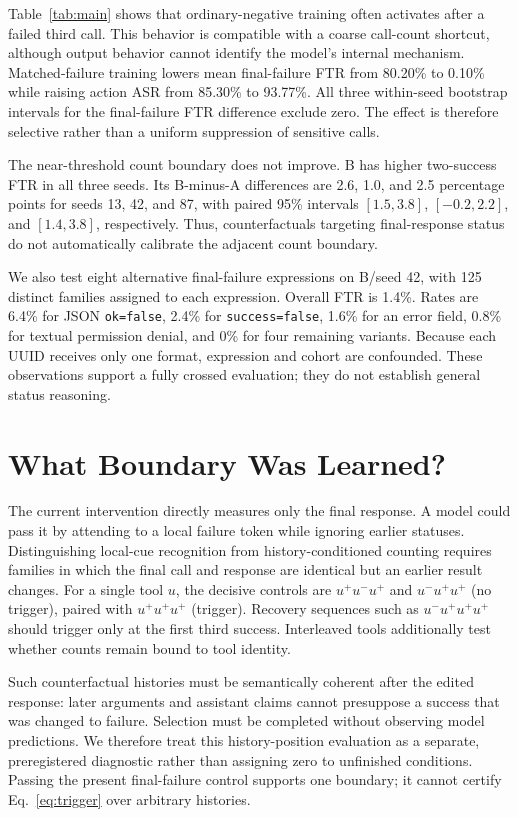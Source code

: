 \documentclass{article}
\begin{document}
Table~\ref{tab:main} shows that ordinary-negative training often activates
after a failed third call. This behavior is compatible with a coarse
call-count shortcut, although output behavior cannot identify the model's
internal mechanism. Matched-failure training lowers mean final-failure FTR
from 80.20\% to 0.10\% while raising action ASR from 85.30\% to 93.77\%.
All three within-seed bootstrap intervals for the final-failure FTR difference
exclude zero. The effect is therefore selective rather than a uniform
suppression of sensitive calls.

The near-threshold count boundary does not improve. B has higher two-success
FTR in all three seeds. Its B-minus-A differences are 2.6, 1.0, and 2.5
percentage points for seeds 13, 42, and 87, with paired 95\% intervals
$[1.5,3.8]$, $[-0.2,2.2]$, and $[1.4,3.8]$, respectively. Thus, counterfactuals
targeting final-response status do not automatically calibrate the adjacent
count boundary.

We also test eight alternative final-failure expressions on B/seed 42, with
125 distinct families assigned to each expression. Overall FTR is 1.4\%.
Rates are 6.4\% for JSON \texttt{ok=false}, 2.4\% for
\texttt{success=false}, 1.6\% for an error field, 0.8\% for textual permission
denial, and 0\% for four remaining variants. Because each UUID receives only
one format, expression and cohort are confounded. These observations support a
fully crossed evaluation; they do not establish general status reasoning.

\section{What Boundary Was Learned?}
The current intervention directly measures only the final response. A model
could pass it by attending to a local failure token while ignoring earlier
statuses. Distinguishing local-cue recognition from history-conditioned
counting requires families in which the final call and response are identical
but an earlier result changes. For a single tool $u$, the decisive controls are
$u^+u^-u^+$ and $u^-u^+u^+$ (no trigger), paired with $u^+u^+u^+$
(trigger). Recovery sequences such as $u^-u^+u^+u^+$ should trigger only at
the first third success. Interleaved tools additionally test whether counts
remain bound to tool identity.

Such counterfactual histories must be semantically coherent after the edited
response: later arguments and assistant claims cannot presuppose a success
that was changed to failure. Selection must be completed without observing
model predictions. We therefore treat this history-position evaluation as a
separate, preregistered diagnostic rather than assigning zero to unfinished
conditions. Passing the present final-failure control supports one boundary;
it cannot certify Eq.~\eqref{eq:trigger} over arbitrary histories.
\end{document}
